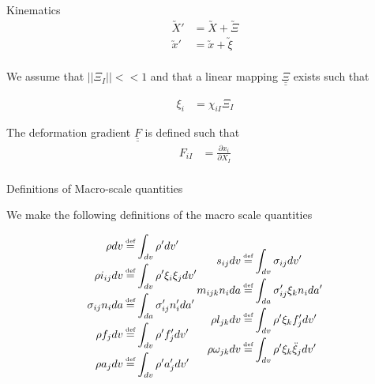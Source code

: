 \documentclass[11pt]{beamer}
\newcommand{\TEN}[1]{\underline{\underline{#1}}}
\newcommand{\VEC}[1]{\utilde{#1}}
\newcommand\defeq{\mathrel{\stackrel{\makebox[0pt]{\mbox{\normalfont\tiny def}}}{=}}}
\newcommand{\LTN}[1]{\left|\left| #1 \right|\right|}
\begin{document}
\begin{frame}{Kinematics}
\begin{align*}
\VEC{X}' &= \VEC{X}+\VEC{\Xi}\\
\VEC{x}' &= \VEC{x}+\VEC{\xi}\\
\end{align*}

We assume that $\LTN{\Xi_{I}} << 1$ and that a linear mapping $\TEN{\Xi}$ exists such that

\begin{align*}
\xi_i &= \chi_{iI} \Xi_I
\end{align*}

The deformation gradient $\TEN{F}$ is defined such that
\begin{align*}
F_{iI} &= \frac{\partial x_i}{\partial X_I}\\
\end{align*}
\end{frame}

\begin{frame}{Definitions of Macro-scale quantities}

We make the following definitions of the macro scale quantities

\begin{equation}
\begin{aligned}[c]
\rho dv &\defeq \int_{dv} \rho' dv'\\
\rho i_{ij} dv &\defeq \int_{dv} \rho' \xi_i \xi_j dv'\\
\sigma_{ij} n_i da &\defeq \int_{da} \sigma_{ij}' n_i' da'\\
\rho f_j dv &\defeq \int_{dv} \rho' f_j' dv'\\
\rho a_j dv &\defeq \int_{dv} \rho' a_j' dv'\\
\end{aligned}
\begin{aligned}
s_{ij} dv &\defeq \int_{dv} \sigma_{ij} dv'\\
m_{ijk} n_i da &\defeq \int_{da} \sigma_{ij}' \xi_k n_i da'\\
\rho l_{jk} dv &\defeq \int_{dv} \rho' \xi_k f_j' dv'\\
\rho \omega_{jk} dv &\defeq \int_{dv} \rho' \xi_k \ddot{\xi}_j dv'\\
\end{aligned}
\end{equation}

\end{frame}
\end{document}
